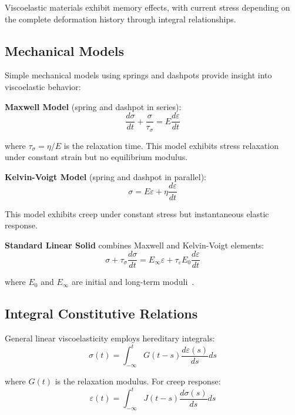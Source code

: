 \begin{keypoint}
Viscoelastic materials exhibit memory effects, with current stress depending on the complete deformation history through integral relationships.
\end{keypoint}

\subsection{Mechanical Models}

Simple mechanical models using springs and dashpots provide insight into viscoelastic behavior:

\textbf{Maxwell Model} (spring and dashpot in series):
\begin{equation}
\frac{d\sigma}{dt} + \frac{\sigma}{\tau_\sigma} = E \frac{d\varepsilon}{dt}
\end{equation}

where $\tau_\sigma = \eta/E$ is the relaxation time. This model exhibits stress relaxation under constant strain but no equilibrium modulus.

\textbf{Kelvin-Voigt Model} (spring and dashpot in parallel):
\begin{equation}
\sigma = E\varepsilon + \eta \frac{d\varepsilon}{dt}
\end{equation}

This model exhibits creep under constant stress but instantaneous elastic response.

\textbf{Standard Linear Solid} combines Maxwell and Kelvin-Voigt elements:
\begin{equation}
\sigma + \tau_\sigma \frac{d\sigma}{dt} = E_\infty \varepsilon + \tau_\varepsilon E_0 \frac{d\varepsilon}{dt}
\end{equation}

where $E_0$ and $E_\infty$ are initial and long-term moduli~\autocite{Sadd.2019}.

\subsection{Integral Constitutive Relations}

General linear viscoelasticity employs hereditary integrals:
\begin{equation}
\sigma(t) = \int_{-\infty}^t G(t-s) \frac{d\varepsilon(s)}{ds} ds
\end{equation}

where $G(t)$ is the relaxation modulus. For creep response:
\begin{equation}
\varepsilon(t) = \int_{-\infty}^t J(t-s) \frac{d\sigma(s)}{ds} ds
\end{equation}

